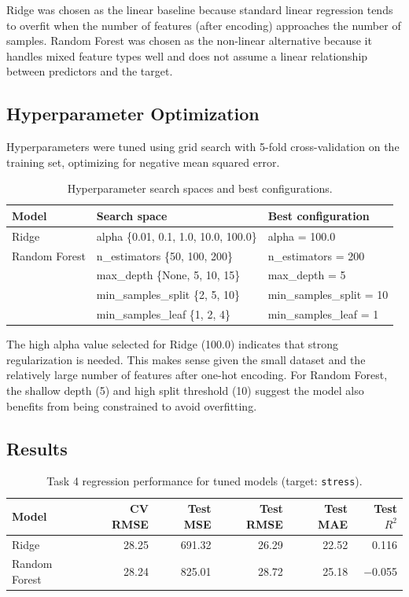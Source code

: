 Ridge was chosen as the linear baseline because standard linear regression tends to overfit when the number of features (after encoding) approaches the number of samples. Random Forest was chosen as the non-linear alternative because it handles mixed feature types well and does not assume a linear relationship between predictors and the target.

\subsection*{Hyperparameter Optimization}

Hyperparameters were tuned using grid search with 5-fold cross-validation on the training set, optimizing for negative mean squared error.

\begin{table}[h]
\caption{Hyperparameter search spaces and best configurations.}
\label{tab:task4_hyper}
\centering
\begin{tabular}{|l|l|l|}
\hline
Model & Search space & Best configuration \\
\hline
Ridge & alpha \{0.01, 0.1, 1.0, 10.0, 100.0\} & alpha = 100.0 \\
\hline
Random Forest & n\_estimators \{50, 100, 200\} & n\_estimators = 200 \\
 & max\_depth \{None, 5, 10, 15\} & max\_depth = 5 \\
 & min\_samples\_split \{2, 5, 10\} & min\_samples\_split = 10 \\
 & min\_samples\_leaf \{1, 2, 4\} & min\_samples\_leaf = 1 \\
\hline
\end{tabular}
\end{table}

The high alpha value selected for Ridge (100.0) indicates that strong regularization is needed. This makes sense given the small dataset and the relatively large number of features after one-hot encoding. For Random Forest, the shallow depth (5) and high split threshold (10) suggest the model also benefits from being constrained to avoid overfitting.

\subsection*{Results}

\begin{table}[h]
\caption{Task 4 regression performance for tuned models (target: \texttt{stress}).}
\label{tab:task4_results}
\centering
\begin{tabular}{|l|r|r|r|r|r|}
\hline
Model & CV RMSE & Test MSE & Test RMSE & Test MAE & Test $R^2$ \\
\hline
Ridge & 28.25 & 691.32 & 26.29 & 22.52 & 0.116 \\
Random Forest & 28.24 & 825.01 & 28.72 & 25.18 & $-$0.055 \\
\hline
\end{tabular}
\end{table}

